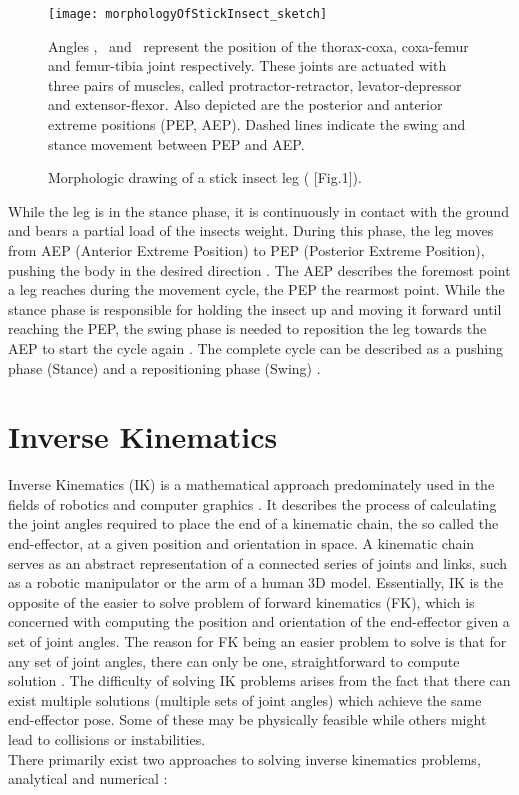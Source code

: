 \begin{figure}[h]
	\centerline{\texttt{[image: morphologyOfStickInsect\_sketch]}}
	\caption{Morphologic drawing of a stick insect leg (\cite{schilling2013walknet} [Fig.1]).}
	\begin{footnotesize}
		Angles \textalpha, \textbeta \ and \textgamma \ represent the position of the thorax-coxa, coxa-femur and femur-tibia joint respectively.
		These joints are actuated with three pairs of muscles, called protractor-retractor, levator-depressor and extensor-flexor.
		Also depicted are the posterior and anterior extreme positions (PEP, AEP).
		Dashed lines indicate the swing and stance movement between PEP and AEP.
	\end{footnotesize}
	
	\label{figure: Stick insect leg}
\end{figure}

While the leg is in the stance phase, it is continuously in contact with the ground and bears a partial load of the insects weight.
During this phase, the leg moves from AEP (Anterior Extreme Position) to PEP (Posterior Extreme Position), pushing the body in the desired direction \parencite{schilling2013walknet}.
The AEP describes the foremost point a leg reaches during the movement cycle, the PEP the rearmost point.
While the stance phase is responsible for holding the insect up and moving it forward until reaching the PEP, the swing phase is needed to reposition the leg towards the AEP to start the cycle again \parencite{schilling2013walknet}.
The complete cycle can be described as a pushing phase (Stance) and a repositioning phase (Swing) .


\section{Inverse Kinematics}
Inverse Kinematics (IK) is a mathematical approach predominately used in the fields of robotics and computer graphics \parencite{AristidouFABRIK}.
It describes the process of calculating the joint angles required to place the end of a kinematic chain, the so called the end-effector, at a given position and orientation in space.
A kinematic chain serves as an abstract representation of a connected series of joints and links, such as a robotic manipulator or the arm of a human 3D model.
Essentially, IK is the opposite of the easier to solve problem of forward kinematics (FK), which is concerned with computing the position and orientation of the end-effector given a set of joint angles.
The reason for FK being an easier problem to solve is that for any set of joint angles, there can only be one, straightforward to compute solution \parencite{inverseKinematicsIllinois}.
The difficulty of solving IK problems arises from the fact that there can exist multiple solutions (multiple sets of joint angles) which achieve the same end-effector pose.
Some of these may be physically feasible while others might lead to collisions or instabilities.\\
There primarily exist two approaches to solving inverse kinematics problems, analytical and numerical \parencite{inverseKinematicsIllinois}:

